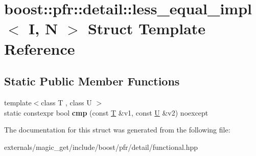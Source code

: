 \hypertarget{structboost_1_1pfr_1_1detail_1_1less__equal__impl}{}\section{boost\+:\+:pfr\+:\+:detail\+:\+:less\+\_\+equal\+\_\+impl$<$ I, N $>$ Struct Template Reference}
\label{structboost_1_1pfr_1_1detail_1_1less__equal__impl}
\subsection*{Static Public Member Functions}
\begin{DoxyCompactItemize}
\item 
\mbox{\label{structboost_1_1pfr_1_1detail_1_1less__equal__impl_acceb2fa29ce3cc61e4271041b5532568}} 
{\footnotesize template$<$class T , class U $>$ }\\static constexpr bool {\bfseries cmp} (const \mbox{\hyperlink{struct_t}{T}} \&v1, const \mbox{\hyperlink{union_u}{U}} \&v2) noexcept
\end{DoxyCompactItemize}


The documentation for this struct was generated from the following file\+:\begin{DoxyCompactItemize}
\item 
externals/magic\+\_\+get/include/boost/pfr/detail/functional.\+hpp\end{DoxyCompactItemize}
